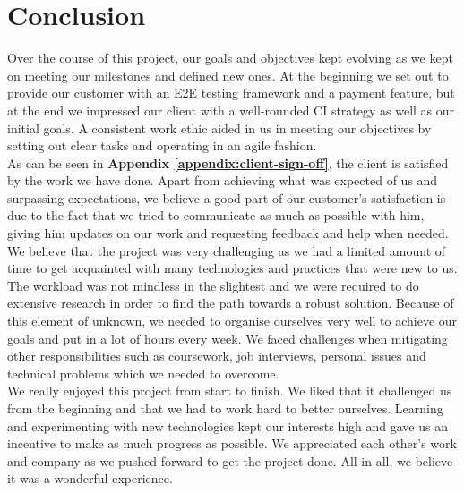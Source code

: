 \chapter{Conclusion}
\label{chap:conclusion}

Over the course of this project, our goals and objectives kept evolving as we kept on meeting our milestones and defined new ones. At the beginning we set out to provide our customer with an E2E testing framework and a payment feature, but at the end we impressed our client with a well-rounded CI strategy as well as our initial goals. A consistent work ethic aided in us in meeting our objectives by setting out clear tasks and operating in an agile fashion.\\

As can be seen in \textbf{Appendix \ref{appendix:client-sign-off}}, the client is satisfied by the work we have done. Apart from achieving what was expected of us and surpassing expectations, we believe a good part of our customer's satisfaction is due to the fact that we tried to communicate as much as possible with him, giving him updates on our work and requesting feedback and help when needed.\\

We believe that the project was very challenging as we had a limited amount of time to get acquainted with many technologies and practices that were new to us. The workload was not mindless in the slightest and we were required to do extensive research in order to find the path towards a robust solution. Because of this element of unknown, we needed to organise ourselves very well to achieve our goals and put in a lot of hours every week. We faced challenges when mitigating other responsibilities such as coursework, job interviews, personal issues and technical problems which we needed to overcome.\\

We really enjoyed this project from start to finish. We liked that it challenged us from the beginning and that we had to work hard to better ourselves. Learning and experimenting with new technologies kept our interests high and gave us an incentive to make as much progress as possible. We appreciated each other's work and company as we pushed forward to get the project done. All in all, we believe it was a wonderful experience.
